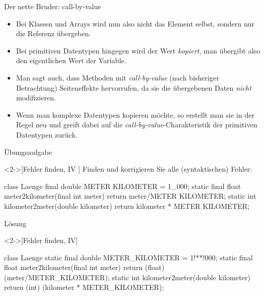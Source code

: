 \begin{frame}{Der nette Bruder: call-by-value}
    \begin{itemize}[<+(1)->]
        \widei
        \item \hypertarget<1>{mrk:call-by-val}{Bei} Klassen und Arrays wird nun also nicht das Element selbst,\pause{} sondern nur die Referenz übergeben.
        \item Bei primitiven Datentypen hingegen wird der Wert \emph{kopiert},\pause{} man übergibt also den eigentlichen Wert der Variable.
        \item Man sagt auch, dass Methoden mit \emph{call-by-value}  (nach bisheriger Betrachtung) Seiteneffekte hervorrufen,\pause{} da sie die übergebenen Daten \emph{nicht} modifizieren.
        \item Wenn man komplexe Datentypen kopieren möchte,\pause{} so erstellt man sie in der Regel neu und greift dabei auf die \emph{call-by-value}-Charakteristik der primitiven Datentypen zurück.
    \end{itemize}
\end{frame}

\ifull
\begin{frame}[c,fragile]{Übungsaufgabe}
    \begin{exercise}<2->[Fehler finden, IV ]
        \pause{}Finden und korrigieren Sie alle (syntaktischen) Fehler:\pause{}
        \begin{plainvoid}
class Laenge {
    final double METER KILOMETER = 1_000;
    static final float meter2kilometer(final int meter){
        return meter/METER KILOMETER;
    }
    static int kilometer2meter(double kilometer){
        return kilometer * METER KILOMETER;
    }
}
        \end{plainvoid}
    \end{exercise}
\end{frame}

\begin{frame}[c,fragile]{Lösung}
    \begin{solve}<2->[Fehler finden, IV]
        \pause{}\begin{plainjava}
class Laenge {
    static final double METER_KILOMETER = 1!**!000;
    static final float meter2kilometer(final int meter){
        return (float) (meter/METER_KILOMETER);
    }
    static int kilometer2meter(double kilometer){
        return (int) (kilometer * METER_KILOMETER);
    }
}
        \end{plainjava}
    \end{solve}
\end{frame}



